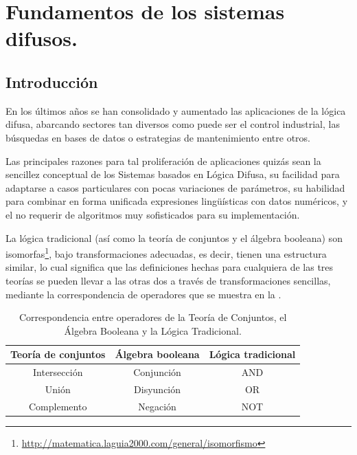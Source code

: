 \section{Fundamentos de los sistemas difusos.}

\subsection{Introducción}
En los últimos años se han consolidado y aumentado las aplicaciones de la lógica difusa, abarcando sectores tan diversos como puede ser el control industrial, las búsquedas en bases de datos o estrategias de mantenimiento entre otros.

Las principales razones para tal proliferación de aplicaciones quizás sean la
sencillez conceptual de los Sistemas basados en Lógica Difusa, su facilidad
para adaptarse a casos particulares con pocas variaciones de parámetros,
su habilidad para combinar en forma unificada expresiones lingüísticas con
datos numéricos, y el no requerir de algoritmos muy sofisticados para su
implementación.

La lógica tradicional (así como la teoría de conjuntos y el álgebra booleana) son isomorfas\footnote{\url{http://matematica.laguia2000.com/general/isomorfismo}}, bajo transformaciones adecuadas, es decir, tienen una estructura similar, lo cual significa que las definiciones hechas para cualquiera de las tres teorías se pueden llevar a las otras dos a través de transformaciones sencillas, mediante la correspondencia de operadores que se muestra en la .



\begin{table}[h]
	\centering
	\begin{tabular}{@{}ccc@{}}
		\toprule
		\multicolumn{1}{l}{\textbf{Teoría de conjuntos}} & \multicolumn{1}{l}{\textbf{Álgebra booleana}} & \multicolumn{1}{l}{\textbf{Lógica tradicional}} \\ \midrule
		\multicolumn{1}{c}{Intersección}               & \multicolumn{1}{c}{Conjunción}               & \multicolumn{1}{c}{AND}                        \\ \midrule
		\multicolumn{1}{c}{Unión}                      & \multicolumn{1}{c}{Disyunción}               & \multicolumn{1}{c}{OR}                         \\ \midrule
		Complemento                                      & Negación                                      & NOT                                             \\ \bottomrule
	\end{tabular}
	\caption{Correspondencia entre operadores de la Teoría de Conjuntos, el Álgebra Booleana y la Lógica Tradicional.}
	\label{table:1}
\end{table}

